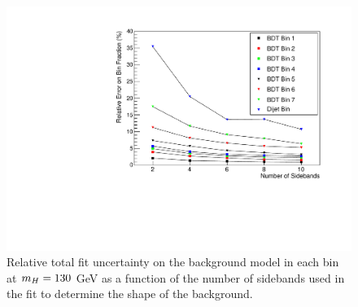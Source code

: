 \begin{figure}
 \begin{center}
  \includegraphics[width=.8\textwidth]{hgg7TeV/sidebandMvaPlots/fits/fracErrorvsNsidebands.pdf}
 \end{center}
 \caption{Relative total fit uncertainty on the background model in each bin at $m_{H}=130$ GeV as a function of the 
 number of sidebands used in the fit to determine the shape of the background.}
 \label{fig:relativefiterrorvsnsidebands}
\end{figure}

